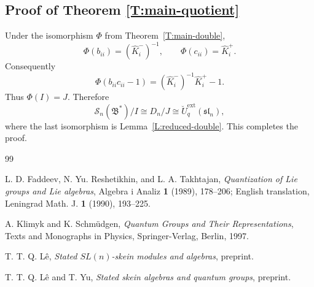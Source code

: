 \documentclass[11pt]{amsart}
\theoremstyle{definition}
\theoremstyle{remark}
\begin{document}
\subsection*{Proof of Theorem \ref{T:main-quotient}}

Under the isomorphism \(\Phi\) from Theorem~\ref{T:main-double},
\[
\Phi(b_{ii})=(\hat K_i^-)^{-1},
\qquad
\Phi(c_{ii})=\hat K_i^+.
\]
Consequently
\[
\Phi(b_{ii}c_{ii}-1)
=(\hat K_i^-)^{-1}\hat K_i^+-1.
\]
Thus \(\Phi(I)=J\).  Therefore
\[
\mathcal S_n(\mathfrak B^*)/I
\cong D_n/J
\cong \breve U_q^{\mathrm{ext}}(\mathfrak{sl}_n),
\]
where the last isomorphism is Lemma~\ref{L:reduced-double}.  This completes
the proof.

\begin{thebibliography}{99}

L. D. Faddeev, N. Yu. Reshetikhin, and L. A. Takhtajan,
\emph{Quantization of Lie groups and Lie algebras},
Algebra i Analiz \textbf{1} (1989), 178--206;
English translation, Leningrad Math. J. \textbf{1} (1990), 193--225.

A. Klimyk and K. Schm\"udgen,
\emph{Quantum Groups and Their Representations},
Texts and Monographs in Physics, Springer-Verlag, Berlin, 1997.

T. T. Q. L\^e,
\emph{Stated \(SL(n)\)-skein modules and algebras},
preprint.

T. T. Q. L\^e and T. Yu,
\emph{Stated skein algebras and quantum groups},
preprint.

\end{thebibliography}
\end{document}
